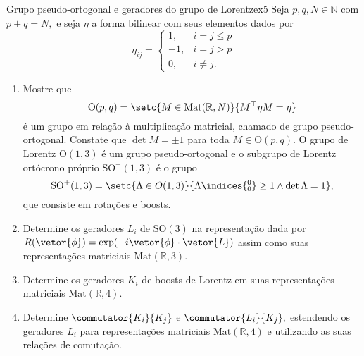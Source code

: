 \begin{exercício}{Grupo pseudo-ortogonal e geradores do grupo de Lorentz}{ex5}
    Seja \(p, q, N \in \mathbb{N}\) com \(p + q = N, \) e seja \(\eta\) a forma bilinear com seus elementos dados por
    \begin{equation*}
        \eta_{ij} = \begin{cases}
            1,&i=j \leq p\\
            -1, &i=j > p\\
            0,& i \neq j.
        \end{cases}
    \end{equation*}
    \begin{enumerate}[label=(\alph*)]
        \item Mostre que 
            \begin{equation*}
                \mathrm{O}(p,q) = \setc{M \in \mathrm{Mat}(\mathbb{R}, N)}{M^\top \eta M = \eta}
            \end{equation*}
            é um grupo em relação à multiplicação matricial, chamado de grupo pseudo-ortogonal. Constate que \(\det M = \pm 1\) para toda \(M \in \mathrm{O}(p,q).\) O grupo de Lorentz \(\mathrm{O}(1,3)\) é um grupo pseudo-ortogonal e o subgrupo de Lorentz ortócrono próprio \(\mathrm{SO}^+(1,3)\) é o grupo
            \begin{equation*}
                \mathrm{SO}^+(1,3) = \setc{\Lambda \in O(1,3)}{\Lambda\indices{^0_0} \geq 1 \land \det\Lambda = 1},
            \end{equation*}
            que consiste em rotações e boosts.
        \item Determine os geradores \(L_i\) de \(\mathrm{SO}(3)\) na representação dada por \(R(\vetor{\phi}) = \exp(-i \vetor{\phi} \cdot \vetor{L})\) assim como suas representações matriciais \(\mathrm{Mat}(\mathbb{R}, 3).\)
        \item Determine os geradores \(K_i\) de boosts de Lorentz em suas representações matriciais \(\mathrm{Mat}(\mathbb{R}, 4).\)
        \item Determine \(\commutator{K_i}{K_j}\) e \(\commutator{L_i}{K_j},\) estendendo os geradores \(L_i\) para representações matriciais \(\mathrm{Mat}(\mathbb{R}, 4)\) e utilizando as suas relações de comutação.
    \end{enumerate}
\end{exercício}
